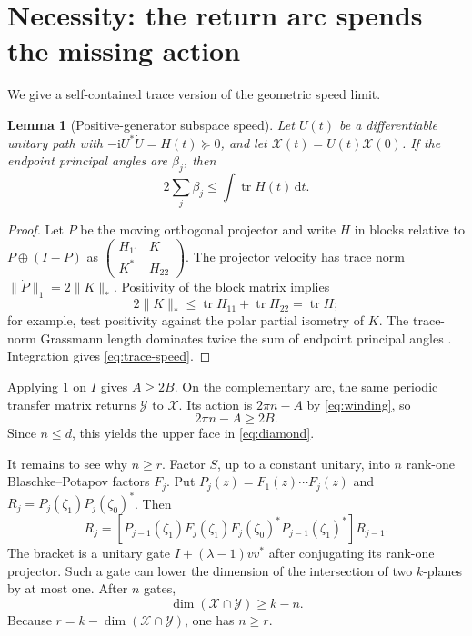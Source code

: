 \documentclass[11pt]{article}
\newtheorem{lemma}[theorem]{Lemma}
\theoremstyle{definition}
\theoremstyle{remark}
\newcommand{\tr}{\operatorname{tr}}
\newcommand{\dd}{\mathrm d}
\begin{document}
\section{Necessity: the return arc spends the missing action}

We give a self-contained trace version of the geometric speed limit.

\begin{lemma}[Positive-generator subspace speed]\label{lem:speed}
Let $U(t)$ be a differentiable unitary path with
$-\mathrm iU^*\dot U=H(t)\succeq0$, and let
$\mathcal X(t)=U(t)\mathcal X(0)$.  If the endpoint principal angles are
$\beta_j$, then
\begin{equation}\label{eq:trace-speed}
 2\sum_j\beta_j\le\int\tr H(t)\,\dd t.
\end{equation}
\end{lemma}

\begin{proof}
Let $P$ be the moving orthogonal projector and write $H$ in blocks relative
to $P\oplus(I-P)$ as
$\left(\begin{smallmatrix}H_{11}&K\\K^*&H_{22}\end{smallmatrix}\right)$.
The projector velocity has trace norm
$\lVert\dot P\rVert_1=2\lVert K\rVert_*$.  Positivity of the block matrix
implies
\[
 2\lVert K\rVert_*\le\tr H_{11}+\tr H_{22}=\tr H;
\]
for example, test positivity against the polar partial isometry of $K$.
The trace-norm Grassmann length dominates twice the sum of endpoint principal
angles \cite{QiuZhangLi2005,AntezanaLarotondaVarela2014}.  Integration gives
\eqref{eq:trace-speed}.
\end{proof}

Applying \cref{lem:speed} on $I$ gives $A\ge2B$.  On the complementary arc,
the same periodic transfer matrix returns $\mathcal Y$ to $\mathcal X$.
Its action is $2\pi n-A$ by \eqref{eq:winding}, so
\begin{equation}\label{eq:return}
 2\pi n-A\ge2B.
\end{equation}
Since $n\le d$, this yields the upper face in \eqref{eq:diamond}.

It remains to see why $n\ge r$.  Factor $S$, up to a constant unitary, into
$n$ rank-one Blaschke--Potapov factors $F_j$.  Put
$P_j(z)=F_1(z)\cdots F_j(z)$ and
$R_j=P_j(\zeta_1)P_j(\zeta_0)^*$.  Then
\[
 R_j=\left[P_{j-1}(\zeta_1)F_j(\zeta_1)F_j(\zeta_0)^*
 P_{j-1}(\zeta_1)^*\right]R_{j-1}.
\]
The bracket is a unitary gate $I+(\lambda-1)vv^*$ after conjugating its
rank-one projector.  Such a gate can
lower the dimension of the intersection of two $k$-planes by at most one.
After $n$ gates,
\[
 \dim(\mathcal X\cap\mathcal Y)\ge k-n.
\]
Because $r=k-\dim(\mathcal X\cap\mathcal Y)$, one has $n\ge r$.
\end{document}
